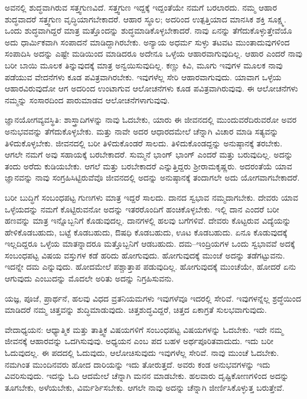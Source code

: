 ಅವನಲ್ಲಿ ಶುದ್ಧವಾಗಿರುವ ಸತ್ತ್ವಗುಣವಿದೆ. ಸತ್ತ್ವಗುಣ ಇದ್ದಕ್ಕೆ ಇದ್ದಂತೆಯೇ ನಮಗೆ ಬರಲಾರದು. ನಮ್ಮ ಆಹಾರ ಶುದ್ಧವಾದರೆ ಸತ್ತ್ವಗುಣ ವೃದ್ಧಿಯಾಗಬೇಕಾದರೆ. ಆಹಾರ ಸ್ಥೂಲ; ಅದರಿಂದ ಉತ್ಪತ್ತಿಯಾದ ಮಾನಸಿಕ ಶಕ್ತಿ ಸೂಕ್ಷ್ಮ. ಒಂದು ಶುದ್ಧವಾಗಿದ್ದರೆ ಮಾತ್ರ ಮತ್ತೊಂದನ್ನು ಶುದ್ಧಮಾಡಿಕೊಳ್ಳಬೇಕಾದರೆ. ನಾವು ಏನನ್ನು ತೆಗೆದುಕೊಳ್ಳುತ್ತೇವೆಯೊ ಅದು ಧಾರ್ಮಿಕವಾಗಿ ಸಂಪಾದನೆ ಮಾಡಿದ್ದಾಗಿರಬೇಕು. ಅನ್ಯಾಯ ಅಧರ್ಮ ಸುಳ್ಳು ತಟವಟ ಮುಂತಾದುವುಗಳಿಂದ ಸಂಪಾದಿಸಿ ಅದನ್ನು ಎಷ್ಟೇ ಮಡಿಯಿಂದ ಮಾಡಿದರೂ ಅದೇನೂ ಒಳ್ಳೆಯ ಆಹಾರವಾಗುವುದಿಲ್ಲ. ಆಹಾರ ಎಂದರೆ ನಾವು ಬರೀ ಬಾಯಿ ಮೂಲಕ ತಿನ್ನುವುದಕ್ಕೆ ಮಾತ್ರ ಅನ್ವಯಿಸುವುದಿಲ್ಲ. ಕಣ್ಣು ಕಿವಿ, ಮೂಗು ಇವುಗಳ ಮೂಲಕ ನಾವು ಪಡೆಯುವ ವೇದನೆಗಳು ಕೂಡ ಪವಿತ್ರವಾಗಿರಬೇಕು. ಇವುಗಳೆಲ್ಲ ಸೇರಿ ಆಹಾರವಾಗುವುದು. ಯಾವಾಗ ಒಳ್ಳೆಯ ಆಹಾರವಿರುವುದೋ ಆಗ ಅದರಿಂದ ಉಂಟಾಗುವ ಆಲೋಚನೆಗಳು ಕೂಡ ಪವಿತ್ರವಾಗಿರುವುವು. ಈ ಆಲೋಚನೆಗಳು ನಮ್ಮನ್ನು ಸಂಸಾರದಿಂದ ಪಾರುಮಾಡವ ಆಲೋಚನೆಗಳಾಗುವುವು.

ಜ್ಞಾನಯೋಗವ್ಯವಸ್ಥಿತಿ: ಶಾಸ್ತ್ರಾದಿಗಳನ್ನು ನಾವು ಓದಬೇಕು, ಯಾರು ಈ ಜೀವನದಲ್ಲಿ ಮುಂದುವರೆದಿರುವರೋ ಅವರ ಅನುಭವವನ್ನು ತೆಗೆದುಕೊಳ್ಳಬೇಕು. ಮತ್ತು ನಾವೇ ಅದರ ಆಧಾರದಮೇಲೆ ಚೆನ್ನಾಗಿ ವಿಚಾರ ಮಾಡಿ ಸತ್ಯವನ್ನು ತಿಳಿದುಕೊಳ್ಳಬೇಕು. ಜೀವನದಲ್ಲಿ ಬರೀ ತಿಳಿದುಕೊಂಡರೆ ಸಾಲದು. ತಿಳಿದುಕೊಂಡದ್ದನ್ನು ಅನುಷ್ಠಾನಕ್ಕೆ ತರಬೇಕು. ಆಗಲೇ ನಮಗೆ ಅವು ಸಹಾಯಕ್ಕೆ ಬರಬೇಕಾದರೆ. ಸುಮ್ಮನೆ ಭಾಂಗ್ ಭಾಂಗ್ ಎಂದರೆ ಮತ್ತು ಬರುವುದಿಲ್ಲ. ಅದನ್ನು ತಂದು ಅರೆದು ಕುಡಿಯಬೇಕು. ಆಗಲೆ ಮತ್ತು ಬರಬೇಕಾದರೆ ಎನ್ನುತ್ತಿದ್ದರು ಶ‍್ರೀರಾಮಕೃಷ್ಣರು. ಅದರಂತೆಯೆ ಯಾವ ಜ್ಞಾನವನ್ನು ನಾವು ಸಂಗ್ರಹಿಸಿಟ್ಟಿರುವೆವೊ ಜೀವನದಲ್ಲಿ ಅದನ್ನು ಅನುಷ್ಠಾನಕ್ಕೆ ತಂದಾಗಲೇ ಅದು ಯೋಗವಾಗಬೇಕಾದರೆ.

ಬರೀ ಬುದ್ಧಿಗೆ ಸಂಬಂಧಪಟ್ಟ ಗುಣಗಳು ಮಾತ್ರ ಇದ್ದರೆ ಸಾಲದು. ದಾನದ ಸ್ವಭಾವ ನಮ್ಮದಾಗಬೇಕು. ದೇವರು ಯಾವ ಒಳ್ಳೆಯದನ್ನು ನಮಗೆ ಕೊಟ್ಟಿರುವನೋ ಅದನ್ನು ಇತರರೊಂದಿಗೆ ಹಂಚಿಕೊಳ್ಳಬೇಕು. ಇಲ್ಲಿ ದಾನ ಎಂದರೆ ಬರೀ ಹಣವನ್ನು ಮಾತ್ರ ಇನ್ನೊಬ್ಬನಿಗೆ ಕೊಡುವುದಲ್ಲ. ದಾನಗಳಲ್ಲಿ ಹಲವು ಬಗೆಗಳಿವೆ. ದೇವರು ಕೊಟ್ಟರುವ ವಿದ್ಯೆಯನ್ನು ಹೇಳಿಕೊಡಬಹುದು, ಬಟ್ಟೆ ಕೊಡಬಹುದು, ಔಷಧಿ ಕೊಡಬಹುದು, ಊಟ ಕೊಡಬಹುದು. ಏನೂ ಕೊಡುವುದಕ್ಕೆ ಇಲ್ಲದಿದ್ದರೂ ಒಳ್ಳೆಯ ಮಾತನ್ನಾದರೂ ಮತ್ತೊಬ್ಬನಿಗೆ ಆಡಬಹುದು. ದಮ--ಇಂದ್ರಿಯಗಳ ಒಂದು ಸ್ವಭಾವವೆ ಅದಕ್ಕೆ ಸಂಬಂಧಪಟ್ಟ ವಿಷಯ ವಸ್ತುಗಳ ಕಡೆ ಹರಿದು ಹೋಗುವುದು. ಹೋಗುವುದಕ್ಕೆ ಮುಂಚೆ ಅದನ್ನು ತಡೆಗಟ್ಟುವನು. ಇದನ್ನೇ ದಮ ಎನ್ನುವುದು. ಹೋದಮೇಲೆ ಪಶ್ಚಾತ್ತಾಪ ಪಡುವುದಿಲ್ಲ. ಹೋಗುವುದಕ್ಕೆ ಮುಂಚೆಯೇ, ಹೋದರೆ ಏನು ಆಗುವುದು ಎಂಬುದನ್ನು ಮೊದಲೇ ಅರಿತು ಅದನ್ನು ನಿಗ್ರಹಿಸುವನು.

ಯಜ್ಞ, ಪೂಜೆ, ಪ್ರಾರ್ಥನೆ, ಹಲವು ವಿಧದ ವ್ರತನಿಯಮಗಳು ಇವುಗಳೆವೂ ಇದರಲ್ಲಿ ಸೇರಿವೆ. ಇವುಗಳನ್ನೆಲ್ಲ ಶ್ರದ್ಧೆಯಿಂದ ಮಾಡಿದರೆ ನಮ್ಮ ಚಿತ್ತವನ್ನು ಶುದ್ಧಿಮಾಡುವುದು. ಚಿತ್ತಶುದ್ಧವಿದ್ದರೆ, ಚಿತ್ತದ ಏಕಾಗ್ರತೆ ಸುಲಭವಾಗುವುದು.

ವೇದಾಧ್ಯಯನ: ಆಧ್ಯಾತ್ಮಿಕ ಮತ್ತು ತಾತ್ತ್ವಿಕ ವಿಷಯಗಳಿಗೆ ಸಂಬಂಧಪಟ್ಟ ವಿಷಯಗಳನ್ನು ಓದಬೇಕು. ಇದೇ ನಮ್ಮ ಜೀವನಕ್ಕೆ ಆಹಾರವನ್ನು ಒದಗಿಸುವುವು. ಅಧ್ಯಯನ ಎಂಬ ಪದ ಬಹಳ ಅರ್ಥಪೂರಿತವಾದುದು. ಇದು ಬರೀ ಓದುವುದಲ್ಲ. ಈ ಪದದಲ್ಲಿ ಓದುವುದು, ಆಲೋಚಿಸುವುದು ಇವುಗಳೆಲ್ಲ ಸೇರಿವೆ. ನಾವು ಮುಂಚೆ ಓದಬೇಕು. ನಮಗಿಂತ ಮುಂದಿನವರು ಹೋದ ದಾರಿಯನ್ನು ಇದು ತೋರುತ್ತದೆ. ಅವರು ಕಂಡ ಅನುಭವಗಳನ್ನು ಇದು ವಿವರಿಸುವುದು. ಇದನ್ನು ಓದಿ ಆದಮೇಲೆ ಚೆನ್ನಾಗಿ ಮನನ ಮಾಡಬೇಕು. ಹಲವಾರು ದೃಷ್ಟಿಕೋಣಗಳಿಂದ ಅದನ್ನು ತೂಗಬೇಕು, ಅಳೆಯಬೇಕು, ವಿರ್ಮರ್ಶಿಸಬೇಕು. ಆಗಲೇ ನಾವು ಅದನ್ನು ಚೆನ್ನಾಗಿ ಜೀರ್ಣಿಸಿಕೊಳ್ಳುತ್ತ ಬರುತ್ತೇವೆ.

